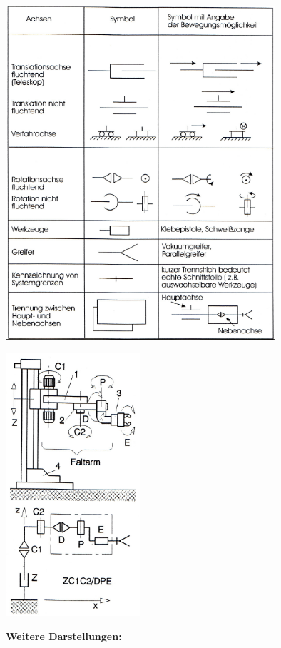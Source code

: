 \begin{minipage}{10cm}
	\includegraphics[width=10cm]{./bilder/symbole}
\end{minipage}
\begin{minipage}{5.1cm}
	\includegraphics[width=5cm]{./bilder/symbole-bsp}
\end{minipage}
\begin{minipage}{0.2\linewidth}
    \textbf{Weitere Darstellungen:}\newline
    \newline
    \newline
    \newline
    \newline
    \newline
\end{minipage}


